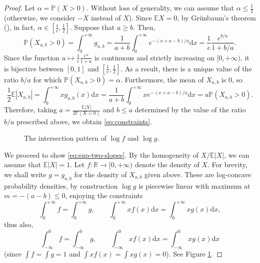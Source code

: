 \documentclass[10pt]{amsart}
\newcommand{\dd}{\mathrm{d}}
\newcommand{\E}{\mathbb{E}}
\newcommand{\1}{\textbf{1}}
\newcommand{\R}{\mathbb{R}}
\newcommand{\p}[1]{\mathbb{P}\left( #1 \right)}
\newcommand{\red}{}
\theoremstyle{remark}
\theoremstyle{definition}
\begin{document}
\begin{proof}
Let $\alpha = \p{X > 0}$. Without loss of generality, we can assume that $\alpha \leq \frac12$ (otherwise, we consider $-X$ instead of $X$). Since $\E X = 0$, by Gr\"unbaum's theorem (\cite[Lemma~2.2.6]{BGVV}), in fact, $\alpha \in [\frac1e, \frac12]$. 
Suppose that $a \geq b$. Then,
\[
\p{X_{a,b} > 0} = \int_0^{+\infty} g_{a,b} = \frac{1}{a+b}\int_0^{+\infty} e^{-(x+a-b)/a} \dd x = \frac{1}{e}\frac{e^{b/a}}{1+b/a}.
\]
Since the function $u \mapsto \frac{1}{e}\frac{e^u}{1+u}$ is continuous and strictly increasing on $[0,{+\infty})$, it is bijective between $[0,1]$ and $[\frac1e, \frac12]$. As a result, there is a unique value of the ratio $b/a$ for which $\p{X_{a,b} > 0} = \alpha$. Furthermore, the mean of $X_{a,b}$ is $0$, so
\[
\frac12\E|X_{a,b}| = \int_0^{+\infty} xg_{a,b}(x) \dd x = \frac{1}{a+b}\int_0^{+\infty} xe^{-(x+a-b)/a} \dd x = a\p{X_{a,b} > 0}.
\]
Therefore, taking $a = \frac{\E|X|}{2\p{X >0}}$ and $b \leq a$ determined by the value of the ratio $b/a$ prescribed above, we obtain \eqref{eq:constraints}.

\begin{figure}
    \centering
{}
    \caption{The intersection pattern of $\log f$ and $\log g$.}
    \label{fig:f-g}
\end{figure}



We proceed {\red to show} \eqref{eq:sup-two-slopes}. By the homogeneity of $X/\E|X|$, we can assume that $\E|X| = 1$. Let $f\colon \R \to [0,{+\infty})$ denote the density of $X$. For brevity, we shall write $g = g_{a,b}$ for the density of $X_{a,b}$ given above. These are log-concave probability densities, by construction $\log g$ is piecewise linear with maximum at $m = -(a-b) \leq 0$, enjoying the constraints
\[
\int_0^{+\infty} f = \int_0^{+\infty} g, \qquad \int_0^{+\infty} xf(x) \dd x = \int_0^{+\infty} xg(x) \dd x,
\]
thus also,
\[
\int_{-\infty}^0 f = \int_{-\infty}^0 g, \qquad \int_{-\infty}^0 xf(x) \dd x = \int_{-\infty}^0 xg(x) \dd x
\]
(since $\int f = \int g = 1$ and $\int xf(x) = \int xg(x) = 0$). See Figure \ref{fig:f-g}.


\end{proof}
\end{document}
